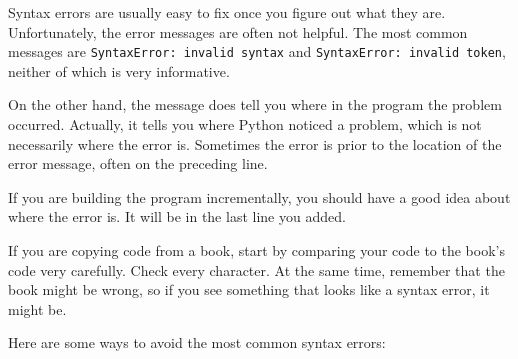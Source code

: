 \documentclass[10pt]{book}
\begin{document}

Syntax errors are usually easy to fix once you figure out what they
are.  Unfortunately, the error messages are often not helpful.
The most common messages are {\tt SyntaxError: invalid syntax} and
{\tt SyntaxError: invalid token}, neither of which is very informative.

On the other hand, the message does tell you where in the program the
problem occurred.  Actually, it tells you where Python
noticed a problem, which is not necessarily where the error
is.  Sometimes the error is prior to the location of the error
message, often on the preceding line.


If you are building the program incrementally, you should have
a good idea about where the error is.  It will be in the last
line you added.

If you are copying code from a book, start by comparing
your code to the book's code very carefully.  Check every character.
At the same time, remember that the book might be wrong, so
if you see something that looks like a syntax error, it might be.

Here are some ways to avoid the most common syntax errors:

\end{document}
